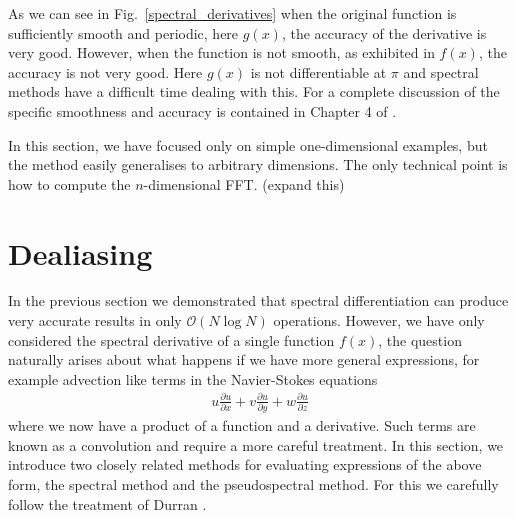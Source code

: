 As we can see in Fig.~\ref{spectral_derivatives} when the original function is sufficiently smooth and periodic, here $g(x)$, the accuracy of the derivative is very good. However, when the function is not smooth, as exhibited in $f(x)$, the accuracy is not very good. Here $g(x)$ is not differentiable at $\pi$ and spectral methods have a difficult time dealing with this. For a complete discussion of the specific smoothness and accuracy is contained in Chapter 4 of \cite{trefethen_spectral}.

In this section, we have focused only on simple one-dimensional examples, but the method easily generalises to arbitrary dimensions. The only technical point is how to compute the $n$-dimensional FFT. (expand this)
\section{Dealiasing} 
In the previous section we demonstrated that spectral differentiation can produce very accurate results in only $\mathcal{O}(N\log N)$ operations. However, we have only considered the spectral derivative of a single function $f(x)$, the question naturally arises about what happens if we have more general expressions, for example advection like terms in the Navier-Stokes equations 
\begin{align}
u\frac{\partial u}{\partial x} + v\frac{\partial u}{\partial y} +w\frac{\partial u}{\partial z}
\end{align}
where we now have a product of a function and a derivative. Such terms are known as a convolution and require a more careful treatment. In this section, we introduce two closely related methods for evaluating expressions of the above form, the spectral method and the pseudospectral method. For this we carefully follow the treatment of Durran \cite{durran}. 

